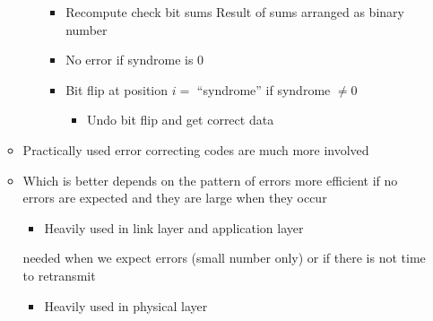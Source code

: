 \begin{itemize}
\begin{itemize}
\begin{itemize}
                        \begin{itemize}
                            \item Recompute check bit sums
                             Result of sums arranged as binary number
                            \item No error if syndrome is $0$
                            \item Bit flip at position $i =$ ``syndrome'' if syndrome $\neq 0$
                                \begin{itemize}
                                    \item Undo bit flip and get correct data
                                \end{itemize}
                        \end{itemize}
                \end{itemize}
            \item Practically used error correcting codes are much more involved
        \end{itemize}
        \begin{itemize}
            \item Which is better depends on the pattern of errors
             more efficient if no errors are expected and they are large when they occur
                \begin{itemize}
                    \item Heavily used in link layer and application layer
                \end{itemize}
             needed when we expect errors (small number only) or if there is not time to retransmit
                \begin{itemize}
                    \item Heavily used in physical layer
                \end{itemize}
        \end{itemize}
\end{itemize}

